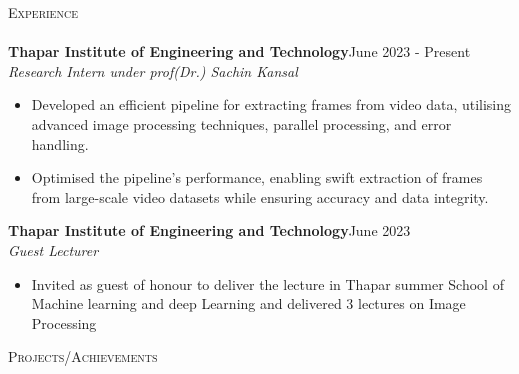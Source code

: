 \documentclass[a4paper]{article}
\newcommand{\lineunder} {
    \vspace*{-8pt} \\
    \hspace*{-18pt} \hrulefill \\
}
\newcommand{\header} [1] {
    {\hspace*{-18pt}\vspace*{6pt} \textsc{#1}}
    \vspace*{-6pt} \lineunder
}
\begin{document}
\vspace{0.5mm}
\header{Experience}


{\textbf{Thapar Institute of Engineering and Technology}}\hfill June 2023 - Present \\
 {\textit{Research Intern under prof(Dr.) Sachin Kansal }}  \
\vspace{-2.5mm}
\begin{itemize} 
\item Developed an efficient pipeline for extracting frames from video data, utilising advanced image processing techniques, parallel processing, and error handling. 
\vspace{-3mm}
\item Optimised the pipeline's performance, enabling swift extraction of frames from large-scale video datasets while ensuring accuracy and data integrity.
\end{itemize}
{\textbf{Thapar Institute of Engineering and Technology}}\hfill June 2023 \\
 {\textit{Guest Lecturer}}  \
\vspace{-1.5mm}
\begin{itemize} 
\item Invited as guest of  honour to deliver the lecture in Thapar summer School of Machine learning and deep Learning and delivered 3 lectures on Image Processing
\end{itemize}

\header{Projects/Achievements}
\end{document}

